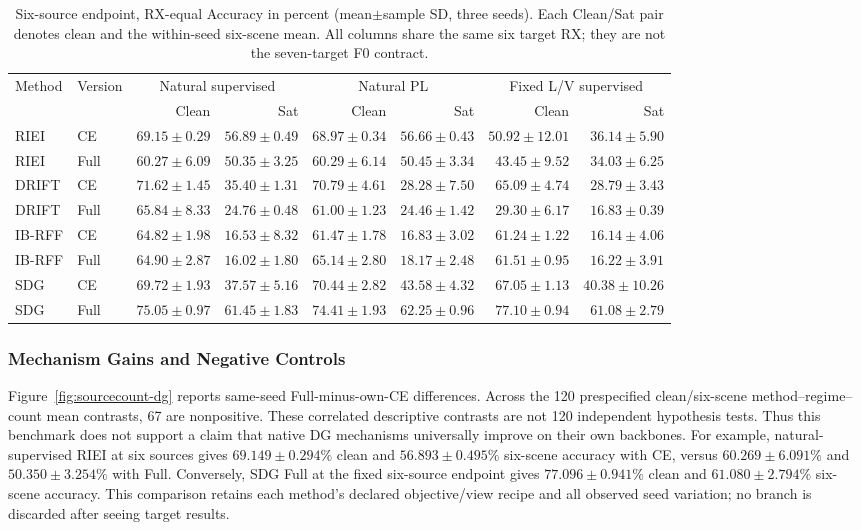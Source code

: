 \begin{table}[t]
\centering\footnotesize
\caption{Six-source endpoint, RX-equal Accuracy in percent (mean$\pm$sample SD, three seeds). Each Clean/Sat pair denotes clean and the within-seed six-scene mean. All columns share the same six target RX; they are not the seven-target F0 contract.}
\label{tab:sourcecount-m6}
\begin{tabular}{llrrrrrr}
\toprule
Method & Version & \multicolumn{2}{c}{Natural supervised} & \multicolumn{2}{c}{Natural PL} & \multicolumn{2}{c}{Fixed L/V supervised}\\
 & & Clean & Sat & Clean & Sat & Clean & Sat\\
\midrule
RIEI & CE & $69.15\pm0.29$ & $56.89\pm0.49$ & $68.97\pm0.34$ & $56.66\pm0.43$ & $50.92\pm12.01$ & $36.14\pm5.90$\\
RIEI & Full & $60.27\pm6.09$ & $50.35\pm3.25$ & $60.29\pm6.14$ & $50.45\pm3.34$ & $43.45\pm9.52$ & $34.03\pm6.25$\\
DRIFT & CE & $71.62\pm1.45$ & $35.40\pm1.31$ & $70.79\pm4.61$ & $28.28\pm7.50$ & $65.09\pm4.74$ & $28.79\pm3.43$\\
DRIFT & Full & $65.84\pm8.33$ & $24.76\pm0.48$ & $61.00\pm1.23$ & $24.46\pm1.42$ & $29.30\pm6.17$ & $16.83\pm0.39$\\
IB-RFF & CE & $64.82\pm1.98$ & $16.53\pm8.32$ & $61.47\pm1.78$ & $16.83\pm3.02$ & $61.24\pm1.22$ & $16.14\pm4.06$\\
IB-RFF & Full & $64.90\pm2.87$ & $16.02\pm1.80$ & $65.14\pm2.80$ & $18.17\pm2.48$ & $61.51\pm0.95$ & $16.22\pm3.91$\\
SDG & CE & $69.72\pm1.93$ & $37.57\pm5.16$ & $70.44\pm2.82$ & $43.58\pm4.32$ & $67.05\pm1.13$ & $40.38\pm10.26$\\
SDG & Full & $75.05\pm0.97$ & $61.45\pm1.83$ & $74.41\pm1.93$ & $62.25\pm0.96$ & $77.10\pm0.94$ & $61.08\pm2.79$\\
\bottomrule
\end{tabular}
\end{table}

\subsubsection{Mechanism Gains and Negative Controls}
Figure~\ref{fig:sourcecount-dg} reports same-seed Full-minus-own-CE differences. Across the 120 prespecified clean/six-scene method--regime--count mean contrasts, 67 are nonpositive. These correlated descriptive contrasts are not 120 independent hypothesis tests. Thus this benchmark does not support a claim that native DG mechanisms universally improve on their own backbones. For example, natural-supervised RIEI at six sources gives $69.149\pm0.294\%$ clean and $56.893\pm0.495\%$ six-scene accuracy with CE, versus $60.269\pm6.091\%$ and $50.350\pm3.254\%$ with Full. Conversely, SDG Full at the fixed six-source endpoint gives $77.096\pm0.941\%$ clean and $61.080\pm2.794\%$ six-scene accuracy. This comparison retains each method's declared objective/view recipe and all observed seed variation; no branch is discarded after seeing target results.

